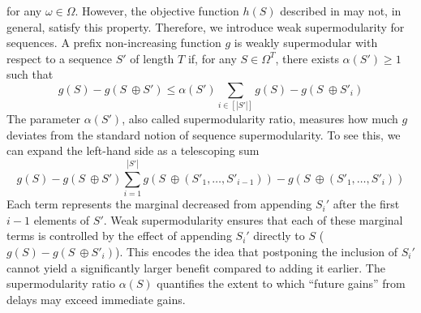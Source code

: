\documentclass{article} %
\begin{document}
for any $\omega \in \Omega$. However, the objective function $h(S)$ described in  may not, in general, satisfy this property. Therefore, we introduce weak supermodularity for sequences. A prefix non-increasing function $g$ is weakly supermodular with respect to a sequence $S'$ of length $T$ if, for any $S \in \Omega^T$, there exists $\alpha(S') \geq 1$ such that
\begin{equation}\label{eqn:alpha_supermod}
     g(S) - g(S\ \oplus S') \leq \alpha(S') \sum_{i \in [|S'|]} g(S) - g(S \ \oplus S'_i)
\end{equation}
The parameter $\alpha(S')$, also called supermodularity ratio, measures how much $g$ deviates from the standard notion of sequence supermodularity.
To see this, we can expand the left-hand side as a telescoping sum $$g(S) - g(S\ \oplus S')\sum_{i = 1}^{|S'|} g(S \ \oplus \left(S'_1, \dots, S'_{i - 1}\right)) - g(S \ \oplus \left(S'_1, \dots, S'_{i}\right))$$ Each term represents the marginal decreased from appending $S_i'$ after the first $i-1$ elements of $S'$. Weak supermodularity ensures that each of these marginal terms is controlled by the effect of appending $S_i'$ directly to $S$ ($g(S) - g(S \ \oplus S'_i)$). This encodes the idea that postponing the inclusion of $S_i'$ cannot yield a significantly larger benefit compared to adding it earlier. The supermodularity ratio $\alpha(S)$ quantifies the extent to which ``future gains'' from delays may exceed immediate gains. 


\end{document}
